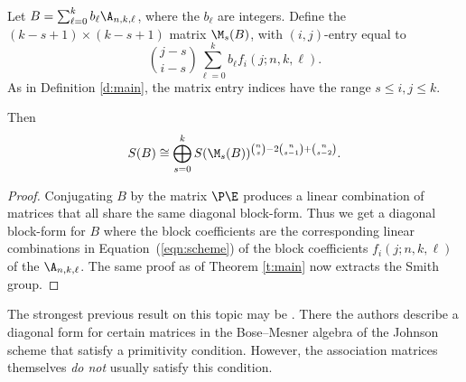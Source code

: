\begin{theorem}\label{t:j_scheme}
Let $B = \sum_{\ell = 0}^{k} b_{\ell} \A_{n,k,\ell}$, where the $b_{\ell}$ are integers.  Define the \mbox{$(k-s+1) \times (k-s+1)$} matrix $\M_{s}(B)$, with $(i,j)$-entry equal to
\begin{equation}\label{eqn:scheme}
\binom{j-s}{i-s}\sum_{\ell = 0}^{k} b_{\ell} f_i(j; n, k, \ell).
\end{equation}
As in Definition \ref{d:main}, the matrix entry indices have the range $s \leq i, j \leq k$.

Then 
\[
S(B) \cong \bigoplus_{s=0}^{k} S(\M_s(B))^{ \binom{n}{s} - 2 \binom{n}{s-1} + \binom{n}{s-2}}.
\]
\end{theorem}
\begin{proof}
    Conjugating $B$ by the matrix $\P \E$ produces a linear combination of matrices that all share the same diagonal block-form.  Thus we get a diagonal block-form for $B$ where the block coefficients are the corresponding linear combinations in Equation~(\ref{eqn:scheme}) of the block coefficients $f_i(j; n, k, \ell)$ of the $\A_{n,k,\ell}$. 
 The same proof as of Theorem \ref{t:main} now extracts the Smith group.
\end{proof}

The strongest previous result on this topic may be \cite[Theorem 9]{wong}.  There the authors describe a diagonal form for certain matrices in the Bose--Mesner algebra of the Johnson scheme that satisfy a primitivity condition.  However, the association matrices themselves \textit{do not} usually satisfy this condition.

